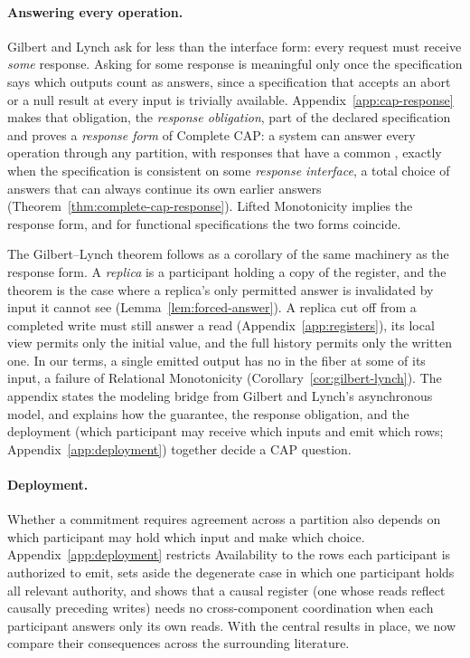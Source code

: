 \paragraph{Answering every operation.}
Gilbert and Lynch ask for less than the interface form: every request
must receive \emph{some} response.  Asking for some response is meaningful only
once the specification says which outputs count as answers, since a specification
that accepts an abort or a null result at every input is trivially available.
Appendix~\ref{app:cap-response} makes that obligation, the \emph{response
obligation}, part of the declared
specification and proves a \emph{response form} of Complete CAP: a system can
answer every operation through any partition, with responses that have a
common \outnoun, exactly when the specification is consistent on some \emph{response
interface}, a total choice of answers that can always continue its own earlier
answers (Theorem~\ref{thm:complete-cap-response}).  Lifted Monotonicity implies
the response form, and for functional specifications the two forms coincide.

The Gilbert--Lynch theorem follows as a corollary of the same machinery as
the response form.  A
\emph{replica} is a participant holding a copy of the register, and the theorem
is the case where a replica's only permitted answer is invalidated by input it
cannot see (Lemma~\ref{lem:forced-answer}).  A replica cut off
from a completed write must still answer a read
(Appendix~\ref{app:registers}), its local view permits only
the initial value, and the full history permits only the written one.  In our
terms, a single emitted output has no \outnoun in the fiber at some \indesc of its
input,
a failure of Relational Monotonicity
(Corollary~\ref{cor:gilbert-lynch}).  The appendix states the modeling bridge
from Gilbert and Lynch's asynchronous model, and explains how the guarantee,
the response obligation, and the deployment (which participant may receive
which inputs and emit which rows; Appendix~\ref{app:deployment}) together
decide a CAP question.

\paragraph{Deployment.}
Whether a commitment requires agreement across a partition also depends on
which participant may hold which input and make which choice.
Appendix~\ref{app:deployment} restricts Availability to the rows each
participant is authorized to emit, sets aside the degenerate case in which one
participant holds all relevant authority, and shows that a causal register (one whose reads reflect
causally preceding writes) needs no cross-component coordination when each participant answers only its
own reads.  With the central results in place, we now compare their
consequences across the surrounding literature.
